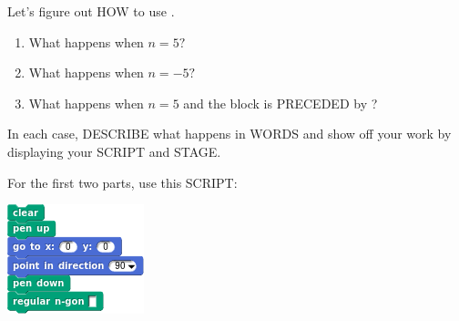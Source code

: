 \documentclass[noauthor,nooutcomes,12pt]{ximera}
\begin{document}
\begin{question}
  Let's figure out HOW to use
  .
  \begin{enumerate}
  \item What happens when $n=5?$
  \item What happens when $n=-5?$
  \item What happens when $n=5$ and the block is PRECEDED by
    ?
  \end{enumerate}
  In each case, DESCRIBE what happens in WORDS and show off your work
  by displaying your SCRIPT and STAGE.
  \begin{hint}
    For the first two parts, use this SCRIPT:
    \begin{center}
      \includegraphics{nGonBlockClearBlank.png}
    \end{center}
  \end{hint}
  

\end{question}
\end{document}
